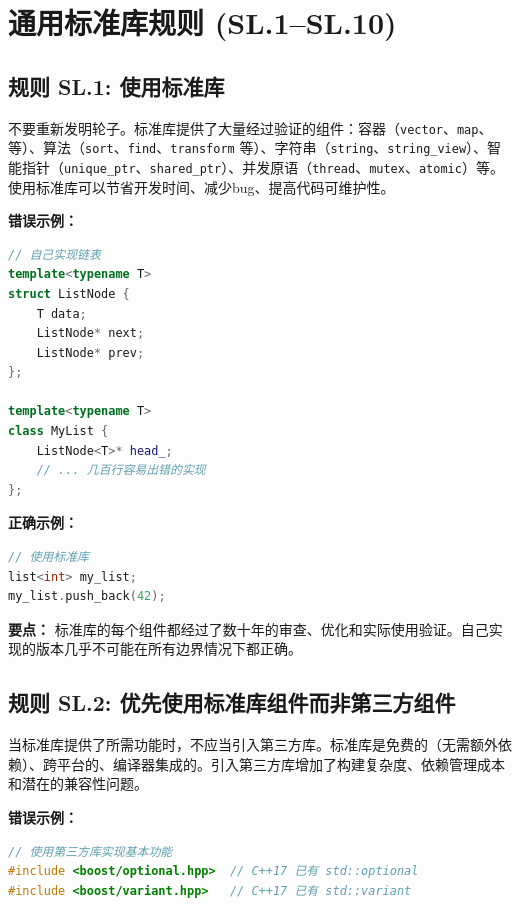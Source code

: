 \section{通用标准库规则 (SL.1--SL.10)}

\subsection*{\textbf{规则 SL.1:} 使用标准库}

不要重新发明轮子。标准库提供了大量经过验证的组件：容器（\texttt{vector}、\texttt{map}、\texttt{} 等）、算法（\texttt{sort}、\texttt{find}、\texttt{transform} 等）、字符串（\texttt{string}、\texttt{string\_view}）、智能指针（\texttt{unique\_ptr}、\texttt{shared\_ptr}）、并发原语（\texttt{thread}、\texttt{mutex}、\texttt{atomic}）等。使用标准库可以节省开发时间、减少bug、提高代码可维护性。

\textbf{错误示例：}

\begin{lstlisting}[language=C++]
// 自己实现链表
template<typename T>
struct ListNode {
    T data;
    ListNode* next;
    ListNode* prev;
};

template<typename T>
class MyList {
    ListNode<T>* head_;
    // ... 几百行容易出错的实现
};
\end{lstlisting}

\textbf{正确示例：}

\begin{lstlisting}[language=C++]
// 使用标准库
list<int> my_list;
my_list.push_back(42);
\end{lstlisting}

\textbf{要点：} 标准库的每个组件都经过了数十年的审查、优化和实际使用验证。自己实现的版本几乎不可能在所有边界情况下都正确。

\subsection*{\textbf{规则 SL.2:} 优先使用标准库组件而非第三方组件}

当标准库提供了所需功能时，不应当引入第三方库。标准库是免费的（无需额外依赖）、跨平台的、编译器集成的。引入第三方库增加了构建复杂度、依赖管理成本和潜在的兼容性问题。

\textbf{错误示例：}

\begin{lstlisting}[language=C++]
// 使用第三方库实现基本功能
#include <boost/optional.hpp>  // C++17 已有 std::optional
#include <boost/variant.hpp>   // C++17 已有 std::variant
\end{lstlisting}

